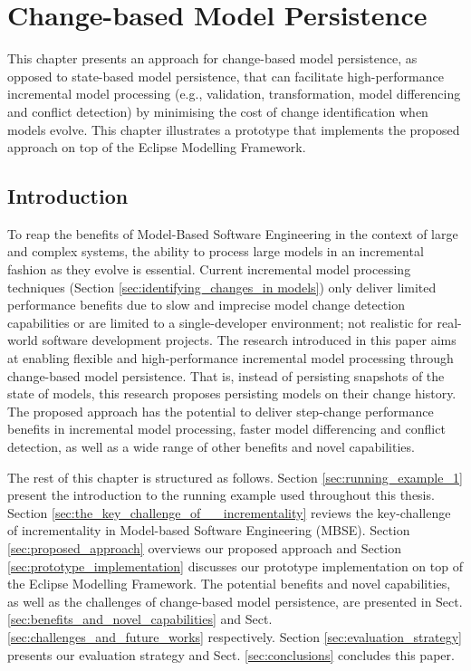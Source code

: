 \chapter{Change-based Model Persistence}
This chapter presents an approach for change-based model 
persistence, as opposed to state-based model persistence,
that can facilitate high-performance incremental model processing 
(e.g., validation, transformation,
model differencing and conflict detection) by minimising the cost 
of change identification when models evolve. 
This chapter illustrates a prototype that implements the proposed
approach on top of the Eclipse Modelling Framework.

\section{Introduction}
\label{Introduction}
To reap the benefits of Model-Based Software Engineering in the context 
of large and complex systems, the ability to process large models 
in an incremental fashion as they evolve is essential. 
Current incremental model processing techniques 
(Section \ref{sec:identifying_changes_in models}) only deliver limited 
performance benefits due to slow and imprecise model change detection 
capabilities or are limited to a single-developer environment;
not realistic for real-world software development projects.
The research introduced in this paper aims at enabling flexible 
and high-performance incremental model processing through 
change-based model persistence. That is, instead of persisting snapshots 
of the state of models, this research proposes persisting models on their change history. 
The proposed approach has the potential to 
deliver step-change performance benefits in incremental model processing, 
faster model differencing and conflict detection, 
as well as a wide range of other benefits and novel capabilities.

The rest of this chapter is structured as follows. 
Section \ref{sec:running_example_1} 
present the introduction to the running example used throughout this thesis. 
Section \ref{sec:the_key_challenge_of_ _incrementality} 
reviews the key-challenge of incrementality in Model-based Software Engineering (MBSE). 
Section \ref{sec:proposed_approach} overviews our proposed approach 
and Section \ref{sec:prototype_implementation} discusses our prototype 
implementation on top of the Eclipse Modelling Framework. 
The potential benefits and novel capabilities, as well as the challenges 
of change-based model persistence, are presented in 
Sect. \ref{sec:benefits_and_novel_capabilities} and 
Sect. \ref{sec:challenges_and_future_works} respectively. 
Section \ref{sec:evaluation_strategy} presents our evaluation strategy 
and Sect. \ref{sec:conclusions} concludes this paper.

